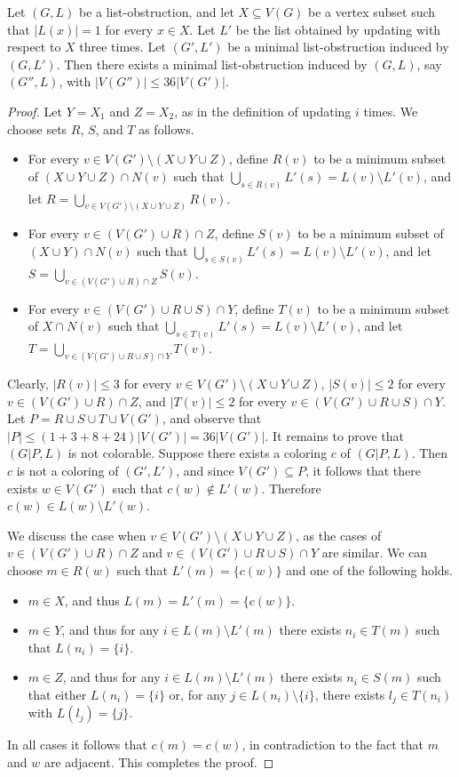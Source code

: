 \documentclass[11pt]{article}
\begin{document}
\begin{lemma}\label{update4}
	Let $(G,L)$ be a list-obstruction, and let $X \subseteq V(G)$ be a vertex subset such that $|L(x)|=1$ for every $x \in X$. 
	Let $L'$ be the list obtained by updating with respect to $X$ three times. 
	Let $(G',L')$ be a minimal list-obstruction induced by $(G,L')$. 
	Then there exists a minimal list-obstruction induced by $(G,L)$, say $(G'',L)$, with $|V(G'')| \leq 36|V(G')|$.
\end{lemma}
\begin{proof}
	Let $Y=X_1$ and $Z=X_2$, as in the definition of updating $i$ times.
	We choose sets $R$, $S$, and $T$ as follows.
	\begin{itemize}
		\item For every $v \in V(G') \setminus (X \cup Y \cup Z)$, define $R(v)$ to be a minimum subset of $(X \cup Y \cup Z)\cap N(v)$ such that $\bigcup_{s \in R(v)}L'(s)=L(v) \setminus L'(v)$, and let $R=\bigcup_{v \in V(G') \setminus (X \cup Y \cup Z)}R(v)$.
		\item For every $v \in (V(G')\cup R) \cap Z$, define $S(v)$ to be a minimum subset of $(X\cup Y)\cap N(v)$ such that $\bigcup_{s \in S(v)}L'(s)=L(v) \setminus L'(v)$, and let $ S=\bigcup_{v \in (V(G')\cup R) \cap Z}S(v) $. 
		\item For every $v \in (V(G')\cup R\cup S) \cap  Y$, define $T(v)$ to be a minimum subset of $X\cap N(v)$ such that $\bigcup_{s \in T(v)}L'(s)=L(v) \setminus L'(v)$, and let $ T= \bigcup_{v \in (V(G')\cup R\cup S) \cap  Y}T(v) $.
	\end{itemize}
	Clearly, $|R(v)| \leq 3$ for every $v \in V(G') \setminus (X \cup Y \cup Z)$, $|S(v)|\le 2$ for every $v \in (V(G')\cup R) \cap Z$, and $|T(v)|\le 2$ for every $v \in (V(G')\cup R\cup S) \cap  Y$.
	Let $P=R\cup S\cup T\cup V(G')$, and observe that $|P|\leq (1+3+8+24) |V(G')|=36|V(G')|$.
	It remains to prove that $(G|P,L)$ is not colorable.
	Suppose there exists a coloring $c$ of $(G|P,L)$.
	Then $c$ is not a coloring of $(G',L')$, and since $V(G') \subseteq P$, it follows that there exists $w \in V(G')$ such that $c(w) \not \in L'(w)$.
	Therefore $c(w) \in L(w) \setminus L'(w)$.
	
	We discuss the case when $v \in V(G') \setminus (X \cup Y \cup Z)$, as the cases of $v \in (V(G')\cup R) \cap Z$ and $v \in (V(G')\cup R\cup S) \cap  Y$ are similar.
	We can choose $m\in R(w)$ such that $L'(m)=\{c(w)\}$ and one of the following holds.
	\begin{itemize}
		\item $m \in X$, and thus $L(m)=L'(m)=\{c(w)\}$.
		\item $m \in Y$, and thus for any $ i\in L(m)\setminus L'(m)$ there exists $n_i\in T(m)$ such that $L(n_i)=\{i\}$.
		\item $m \in Z$, and thus for any $ i\in L(m)\setminus L'(m)$ there exists $n_i\in S(m)$ such that either $L(n_i)=\{i\}$ or, for any $ j\in L(n_i)\setminus \{i\}$, there exists $l_j\in T(n_i)$ with $L(l_j)=\{j\}$.
	\end{itemize}
	In all cases it follows that $c(m)=c(w)$, in contradiction to the fact that $m$ and $w$ are adjacent.
	This completes the proof.
\end{proof}
\end{document}
